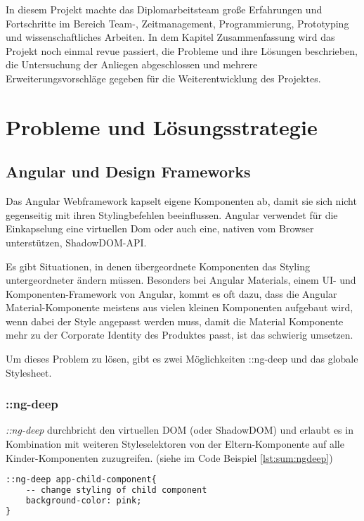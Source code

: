 In diesem Projekt machte das Diplomarbeitsteam große Erfahrungen und Fortschritte im Bereich Team-, Zeitmanagement, Programmierung, Prototyping und wissenschaftliches Arbeiten. In dem Kapitel Zusammenfassung wird das Projekt noch einmal revue passiert, die Probleme und ihre Lösungen beschrieben, die Untersuchung der Anliegen abgeschlossen und mehrere Erweiterungsvorschläge gegeben für die Weiterentwicklung des Projektes.

\section{Probleme und Lösungsstrategie}
\subsection{Angular und Design Frameworks}
Das Angular Webframework kapselt eigene Komponenten ab, damit sie sich nicht gegenseitig mit ihren Stylingbefehlen beeinflussen. Angular verwendet für die Einkapselung eine virtuellen Dom oder auch eine, nativen vom Browser unterstützen, ShadowDOM-API.
\cite{AngularViewencapsulation}

Es gibt Situationen, in denen übergeordnete Komponenten das Styling untergeordneter ändern müssen. Besonders bei Angular Materials, einem UI- und Komponenten-Framework von Angular, kommt es oft dazu, dass die Angular Material-Komponente meistens aus vielen kleinen Komponenten aufgebaut wird, wenn dabei der Style angepasst werden muss, damit die Material Komponente mehr zu der Corporate Identity des Produktes passt, ist das schwierig umsetzen.

Um dieses Problem zu lösen, gibt es zwei Möglichkeiten ::ng-deep und das globale Stylesheet.

\subsubsection{::ng-deep}
\emph{::ng-deep} durchbricht den virtuellen DOM (oder ShadowDOM) und erlaubt es in Kombination mit weiteren Styleselektoren von der Eltern-Komponente auf alle Kinder-Komponenten zuzugreifen. (siehe im Code Beispiel \ref{lst:sum:ngdeep})

\begin{lstlisting}[caption={{Parent.component.scss - Changing Styling in Child Componentes by using :ngdeep}},language=HTML,label=lst:sum:ngdeep]
::ng-deep app-child-component{
    -- change styling of child component
    background-color: pink;
}    
\end{lstlisting}

